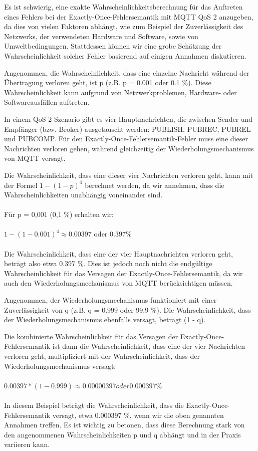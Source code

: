 Es ist schwierig, eine exakte Wahrscheinlichkeitsberechnung für das Auftreten eines Fehlers bei der Exactly-Once-Fehlersemantik mit MQTT QoS 2 anzugeben, da dies von vielen Faktoren abhängt, wie zum Beispiel der Zuverlässigkeit des Netzwerks, der verwendeten Hardware und Software, sowie von Umweltbedingungen. Stattdessen können wir eine grobe Schätzung der Wahrscheinlichkeit solcher Fehler basierend auf einigen Annahmen diskutieren.

Angenommen, die Wahrscheinlichkeit, dass eine einzelne Nachricht während der Übertragung verloren geht, ist p (z.B. p = 0.001 oder 0.1 \%). Diese Wahrscheinlichkeit kann aufgrund von Netzwerkproblemen, Hardware- oder Softwareausfällen auftreten.

In einem QoS 2-Szenario gibt es vier Hauptnachrichten, die zwischen Sender und Empfänger (bzw. Broker) ausgetauscht werden: PUBLISH, PUBREC, PUBREL und PUBCOMP. Für den Exactly-Once-Fehlersemantik-Fehler muss eine dieser Nachrichten verloren gehen, während gleichzeitig der Wiederholungsmechanismus von MQTT versagt.

Die Wahrscheinlichkeit, dass eine dieser vier Nachrichten verloren geht, kann mit der Formel $1 - (1 - p)^4$ berechnet werden, da wir annehmen, dass die Wahrscheinlichkeiten unabhängig voneinander sind.
\\\\
Für p = 0,001 (0,1 \%) erhalten wir:
\\\\
$1 - (1 - 0.001)^4 \approx 0.00397$ oder $0.397 \%$
\\\\
Die Wahrscheinlichkeit, dass eine der vier Hauptnachrichten verloren geht, beträgt also etwa 0.397 \%. Dies ist jedoch noch nicht die endgültige Wahrscheinlichkeit für das Versagen der Exactly-Once-Fehlersemantik, da wir auch den Wiederholungsmechanismus von MQTT berücksichtigen müssen.

Angenommen, der Wiederholungsmechanismus funktioniert mit einer Zuverlässigkeit von q (z.B. q = 0.999 oder 99.9 \%). Die Wahrscheinlichkeit, dass der Wiederholungsmechanismus ebenfalls versagt, beträgt (1 - q).

Die kombinierte Wahrscheinlichkeit für das Versagen der Exactly-Once-Fehlersemantik ist dann die Wahrscheinlichkeit, dass eine der vier Nachrichten verloren geht, multipliziert mit der Wahrscheinlichkeit, dass der Wiederholungsmechanismus versagt:
\\\\
$0.00397 * (1 - 0.999) \approx 0.00000397 oder 0.000397 \%$
\\\\
In diesem Beispiel beträgt die Wahrscheinlichkeit, dass die Exactly-Once-Fehlersemantik versagt, etwa 0.000397 \%, wenn wir die oben genannten Annahmen treffen. Es ist wichtig zu betonen, dass diese Berechnung stark von den angenommenen Wahrscheinlichkeiten p und q abhängt und in der Praxis variieren kann.

